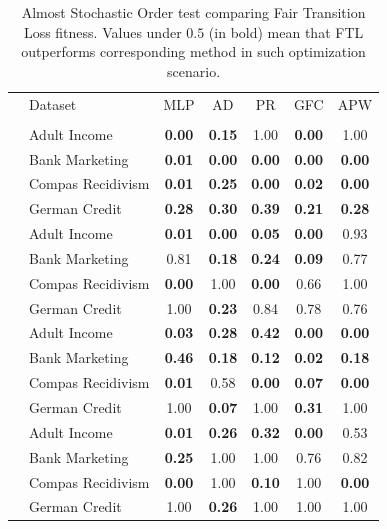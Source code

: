 \begin{table}[ht]
    \centering
    \caption{Almost Stochastic Order test comparing Fair Transition Loss fitness. Values under $0.5$ (in bold) mean that FTL outperforms corresponding method in such optimization scenario.} \label{tab:aso_compare}
    {\footnotesize
    \begin{tabular}{llccccc}
    \toprule
      & Dataset & MLP & AD & PR & GFC & APW \\ \\
\midrule
{} & Adult Income & \textbf{0.00} & \textbf{0.15} & 1.00 & \textbf{0.00} & 1.00 \\
 & Bank Marketing & \textbf{0.01} & \textbf{0.00} & \textbf{0.00} & \textbf{0.00} & \textbf{0.00} \\
 & Compas Recidivism & \textbf{0.01} & \textbf{0.25} & \textbf{0.00} & \textbf{0.02} & \textbf{0.00} \\
 & German Credit & \textbf{0.28} & \textbf{0.30} & \textbf{0.39} & \textbf{0.21} & \textbf{0.28} \vspace{1ex}\\

  & Adult Income & \textbf{0.01} & \textbf{0.00} & \textbf{0.05} & \textbf{0.00} & 0.93 \\
 & Bank Marketing & 0.81 & \textbf{0.18} & \textbf{0.24} & \textbf{0.09} & 0.77 \\
 & Compas Recidivism & \textbf{0.00} & 1.00 & \textbf{0.00} & 0.66 & 1.00 \\
 & German Credit & 1.00 & \textbf{0.23} & 0.84 & 0.78 & 0.76 \vspace{1ex}\\

  & Adult Income & \textbf{0.03} & \textbf{0.28} & \textbf{0.42} & \textbf{0.00} & \textbf{0.00} \\
 & Bank Marketing & \textbf{0.46} & \textbf{0.18} & \textbf{0.12} & \textbf{0.02} & \textbf{0.18} \\
 & Compas Recidivism & \textbf{0.01} & 0.58 & \textbf{0.00} & \textbf{0.07} & \textbf{0.00} \\
 & German Credit & 1.00 & \textbf{0.07} & 1.00 & \textbf{0.31} & 1.00 \\
\midrule
{}  & Adult Income & \textbf{0.01} & \textbf{0.26} & \textbf{0.32} & \textbf{0.00} & 0.53 \\
 & Bank Marketing & \textbf{0.25} & 1.00 & 1.00 & 0.76 & 0.82 \\
 & Compas Recidivism & \textbf{0.00} & 1.00 & \textbf{0.10} & 1.00 & \textbf{0.00} \\
 & German Credit & 1.00 & \textbf{0.26} & 1.00 & 1.00 & 1.00 \vspace{1ex}\\


\end{tabular}}
\end{table}
